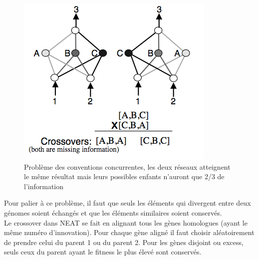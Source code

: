 \documentclass{article}
\begin{document}
\begin{figure}[H]
\begin{center}
	\includegraphics[scale=0.7]{competingconventions.png}
	\caption{Problème des conventions concurrentes, les deux réseaux atteignent le même résultat mais leurs possibles enfants n'auront que 2/3 de l'information \cite{neatpaper}}
\end{center}
\end{figure}

Pour palier à ce problème, il faut que seuls les éléments qui divergent entre deux génomes soient échangés et que les éléments similaires soient conservés.\\

Le crossover dans NEAT se fait en alignant tous les gènes homologues (ayant le même numéro d'innovation). Pour chaque gène aligné il faut choisir aléatoirement de prendre celui du parent 1 ou du parent 2. Pour les gènes disjoint ou excess, seuls ceux du parent ayant le fitness le plus élevé sont conservés.
\end{document}
